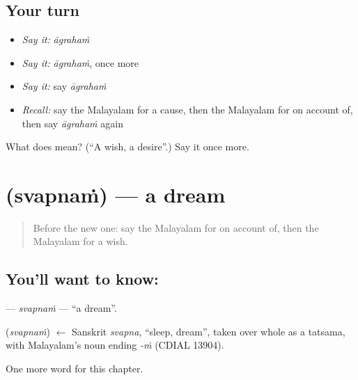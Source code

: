 \subsection*{Your turn}
\begin{itemize}
\raggedright
  \item \emph{Say it:} \emph{āgrahaṁ}
  \item \emph{Say it:} \emph{āgrahaṁ}, once more
  \item \emph{Say it:} say \emph{āgrahaṁ}
  \item \emph{Recall:} say the Malayalam for a cause, then the Malayalam for on account of, then say \emph{āgrahaṁ} again
\end{itemize}

\begin{tcolorbox}[breakable,colback=teal!4,colframe=teal!35!black,title={Before you move on}]
What does  mean? (\textquotedblleft{}A wish, a desire\textquotedblright{}.) Say it once more.
\end{tcolorbox}
\section[\texorpdfstring{\ml{സ്വപ്നം} (svapnaṁ)}{സ്വപ്നം (svapnaṁ)}]{ (svapnaṁ) — a dream}

\label{lesson:ML-C145-svapnam}



\begin{quote}
Before the new one: say the Malayalam for on account of, then the Malayalam for a wish.
\end{quote}

\subsection*{You'll want to know: }
\textbf{} — \emph{svapnaṁ} — \textquotedblleft{}a dream\textquotedblright{}.

\begin{cousinweb}
\textbf{} (\emph{svapnaṁ}) $\leftarrow$ Sanskrit \emph{svapna}, \textquotedblleft{}sleep, dream\textquotedblright{}, taken over whole as a tatsama, with Malayalam's noun ending \emph{-ṁ} (CDIAL 13904).
\end{cousinweb}

\begin{grammarlens}[title={What you've built}]
One more word for this chapter.
\end{grammarlens}

